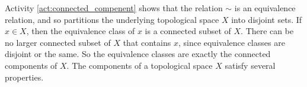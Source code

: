 \begin{comment}

\ActivitySolution

\ba
\item Suppose $\{x\} = U \cup V$ with $U$ and $V$ nonempty relatively open sets and $U \cap V = \emptyset$. Since $\{x\} = U \cup V$, it is the case that $x \in U$ or $x \in V$. But if $x \in U$, then $V = \emptyset$, and if $x \in V$, then $U = \emptyset$. Either contradicts the assumption that $U$ and $V$ are nonempty.

\item Suppose $U$ and $V$ form a separation of $A$. Let $a \in \bigcap_{\alpha \in I} A_{\alpha}$. Let $U' = U \cap A$ and $V' = V \cap A$. The fact that $U' \cap V' = \emptyset$ means that $a \in U$ or $a \in V$, but not both. Without loss of generality, assume that $a \in U$. Let $\alpha \in I$. Since $A_{\alpha}$ is connected, Lemma \ref{lem:separation_subset} tells us that $A_{\alpha}$ is a subset of $U$ or a subset of $V$. But $a \in U$ and $a \in A_{\alpha}$, so it must be that $A_{\alpha} \subseteq U$. But $\alpha$ was an arbitrary element of $I$, so we can conclude that $A \subseteq U$. But then $V \cap A = \emptyset$, a contradiction. Therefore, $A$ must be a connected subset of $X$. 

	\begin{enumerate}[i.]
	
	\item Let $x \in X$. Since $\{x\}$ is connected, we have $x \sim x$. 

	\item Let $x$ and $y$ be in $X$ with $x \sim y$. Then $x$ and $y$ both lie in some connected subset $C$. Thus $y$ and $x$ are both in $C$ and so $y \sim x$. 
	
	\item  Suppose $x \sim y$ and $y \sim z$ for some $x$, $y$, and $z$ in $X$. Then $x$ and $y$ are in some connected subset $C_1$ of $X$. Similarly, $y$ and $z$ are in some connected subset $C_2$ of $X$. But $C_1$ and $C_2$ share the point $y$, so $C_1 \cup C_2$ is connected by part (b). Thus, $x$ and $z$ are elements of the same connected subset of $X$ and $x \sim z$. 

	\end{enumerate}

\ea

\end{comment}

Activity \ref{act:connected_compenent} shows that the relation $\sim$ is an equivalence relation, and so partitions the underlying topological space $X$ into disjoint sets. If $x \in X$, then the equivalence class of $x$ is a connected subset of $X$. There can be no larger connected subset of $X$ that contains $x$, since equivalence classes are disjoint or the same. So the equivalence classes are exactly the connected components of $X$. The components of a topological space $X$ satisfy several properties.

